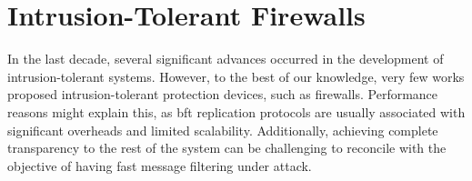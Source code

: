 


\section{Intrusion-Tolerant Firewalls}
\label{building_blocks}

In the last decade, several significant advances occurred in the development of intrusion-tolerant systems.
However, to the best of our knowledge, very few works proposed intrusion-tolerant protection devices, such as firewalls.
Performance reasons might explain this, as \gls{bft} replication protocols are usually associated with significant overheads and limited scalability.
Additionally, achieving complete transparency to the rest of the system can be challenging to reconcile with the objective of having fast message filtering under attack.

